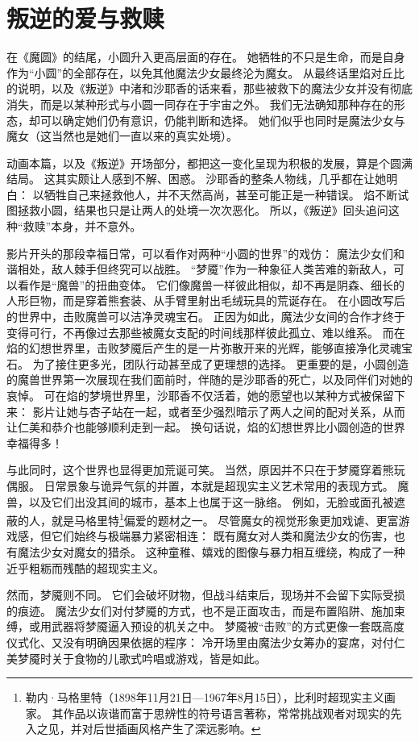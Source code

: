 \chapter{叛逆的爱与救赎}
在《魔圆》的结尾，小圆升入更高层面的存在。
她牺牲的不只是生命，而是自身作为“小圆”的全部存在，以免其他魔法少女最终沦为魔女。
从最终话里焰对丘比的说明，以及《叛逆》中渚和沙耶香的话来看，那些被救下的魔法少女并没有彻底消失，而是以某种形式与小圆一同存在于宇宙之外。
我们无法确知那种存在的形态，却可以确定她们仍有意识，仍能判断和选择。
她们似乎也同时是魔法少女与魔女（这当然也是她们一直以来的真实处境）。

动画本篇，以及《叛逆》开场部分，都把这一变化呈现为积极的发展，算是个圆满结局。
这其实颇让人感到不解、困惑。
沙耶香的整条人物线，几乎都在让她明白：
以牺牲自己来拯救他人，并不天然高尚，甚至可能正是一种错误。
焰不断试图拯救小圆，结果也只是让两人的处境一次次恶化。
所以，《叛逆》回头追问这种“救赎”本身，并不意外。

影片开头的那段幸福日常，可以看作对两种“小圆的世界”的戏仿：
魔法少女们和谐相处，敌人棘手但终究可以战胜。
“梦魇”作为一种象征人类苦难的新敌人，可以看作是“魔兽”的扭曲变体。
它们像魔兽一样彼此相似，却不再是阴森、细长的人形巨物，而是穿着熊套装、从手臂里射出毛绒玩具的荒诞存在。
在小圆改写后的世界中，击败魔兽可以洁净灵魂宝石。
正因为如此，魔法少女间的合作才终于变得可行，不再像过去那些被魔女支配的时间线那样彼此孤立、难以维系。
而在焰的幻想世界里，击败梦魇后产生的是一片弥散开来的光辉，能够直接净化灵魂宝石。
为了接住更多光，团队行动甚至成了更理想的选择。
更重要的是，小圆创造的魔兽世界第一次展现在我们面前时，伴随的是沙耶香的死亡，以及同伴们对她的哀悼。
可在焰的梦境世界里，沙耶香不仅活着，她的愿望也以某种方式被保留下来：
影片让她与杏子站在一起，或者至少强烈暗示了两人之间的配对关系，从而让仁美和恭介也能够顺利走到一起。
换句话说，焰的幻想世界比小圆创造的世界幸福得多！

与此同时，这个世界也显得更加荒诞可笑。
当然，原因并不只在于梦魇穿着熊玩偶服。
日常景象与诡异气氛的并置，本就是超现实主义艺术常用的表现方式。
魔兽，以及它们出没其间的城市，基本上也属于这一脉络。
例如，无脸或面孔被遮蔽的人，就是马格里特\footnote{%
    勒内·马格里特（1898年11月21日—1967年8月15日），比利时超现实主义画家。
    其作品以诙谐而富于思辨性的符号语言著称，常常挑战观者对现实的先入之见，并对后世插画风格产生了深远影响。
}偏爱的题材之一\cite{ref116}。
尽管魔女的视觉形象更加戏谑、更富游戏感，但它们始终与极端暴力紧密相连：
既有魔女对人类和魔法少女的伤害，也有魔法少女对魔女的猎杀。
这种童稚、嬉戏的图像与暴力相互缠绕，构成了一种近乎粗粝而残酷的超现实主义。

然而，梦魇则不同。
它们会破坏财物，但战斗结束后，现场并不会留下实际受损的痕迹。
魔法少女们对付梦魇的方式，也不是正面攻击，而是布置陷阱、施加束缚，或用武器将梦魇逼入预设的机关之中。
梦魇被“击败”的方式更像一套既高度仪式化、又没有明确因果依据的程序：
冷开场里由魔法少女筹办的宴席，对付仁美梦魇时关于食物的儿歌式吟唱或游戏，皆是如此。

